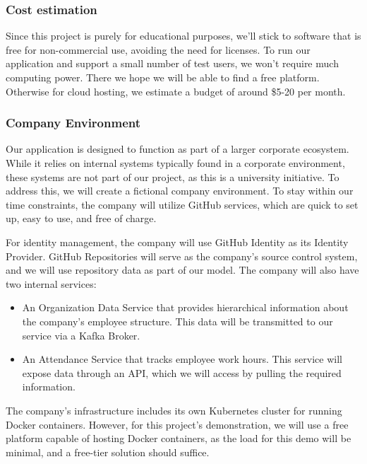 \documentclass[conference]{IEEEtran}
\begin{document}
            \subsubsection{Cost estimation}
            
                Since this project is purely for educational purposes, we’ll stick to software that is free for non-commercial use, avoiding the need for licenses. To run our application and support a small number of test users, we won’t require much computing power. There we hope we will be able to find a free platform. Otherwise for cloud hosting, we estimate a budget of around \$5-20 per month.
                \newline

            \subsubsection{Company Environment}
            
                Our application is designed to function as part of a larger corporate ecosystem. While it relies on internal systems typically found in a corporate environment, these systems are not part of our project, as this is a university initiative. To address this, we will create a fictional company environment. To stay within our time constraints, the company will utilize GitHub services, which are quick to set up, easy to use, and free of charge.
    
                For identity management, the company will use GitHub Identity as its Identity Provider. GitHub Repositories will serve as the company's source control system, and we will use repository data as part of our model. The company will also have two internal services:
                
                \begin{itemize}
                    \item An Organization Data Service that provides hierarchical information about the company's employee structure. This data will be transmitted to our service via a Kafka Broker.
                    \item An Attendance Service that tracks employee work hours. This service will expose data through an API, which we will access by pulling the required information.
                \end{itemize}
                
                The company’s infrastructure includes its own Kubernetes cluster for running Docker containers. However, for this project's demonstration, we will use a free platform capable of hosting Docker containers, as the load for this demo will be minimal, and a free-tier solution should suffice.
            
\end{document}

